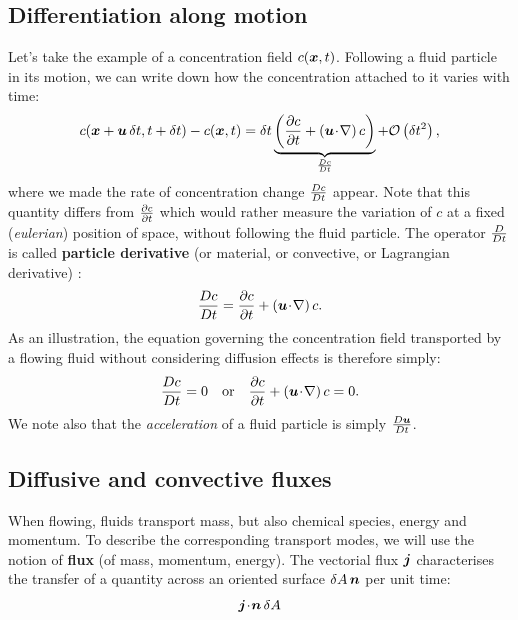 \subsection{Differentiation along motion}
Let's take the example of a concentration field $c(\bx,t)$. Following a fluid particle in its motion, we can write down how the concentration attached to it varies with time:
\begin{equation}
c(\bx+\bu\, \delt,t+\delt) - c(\bx,t) = \delt\underbrace{\lp\pd{c}{t} + \lp \bu \!\cdot\! \nabla \rp c\rp}_{\D{c}{t}} + \mathcal O\lp\delt^2\rp,
\end{equation}
where we made the rate of concentration change $\frac{D c}{D t}$ appear. Note that this quantity differs from $\frac{\partial c}{\partial t}$ which would rather measure the variation of  $c$ at a fixed (\textit{eulerian}) position of space, without following the fluid particle. The operator $\frac{D }{D t}$ is called \textbf{particle derivative} (or material, or convective, or Lagrangian derivative) :
\begin{equation}
\D{c}{t} = \pd{c}{t} + \lp \bu \!\cdot\! \nabla \rp c.
\end{equation}
As an illustration, the equation governing the concentration field transported by a flowing fluid without considering diffusion effects is therefore simply:
\begin{equation}
\D{c}{t} = 0 \quad \text{or}\quad\pd{c}{t} + \lp \bu \!\cdot\! \nabla \rp c = 0.
\end{equation}
We note also that the \textit{acceleration} of a fluid particle is simply $\D{\bu}{t}$.
\subsection{Diffusive and convective fluxes}
When flowing, fluids transport mass, but also chemical species, energy and momentum. To describe the corresponding transport modes, we will use the notion of \textbf{flux} (of mass, momentum, energy).
The vectorial flux $\bj$ characterises the transfer of a quantity across an oriented surface $\delA \,\bn$ per unit time:
\begin{equation}
\bj \!\cdot\! \bn \,\delA
\end{equation}
